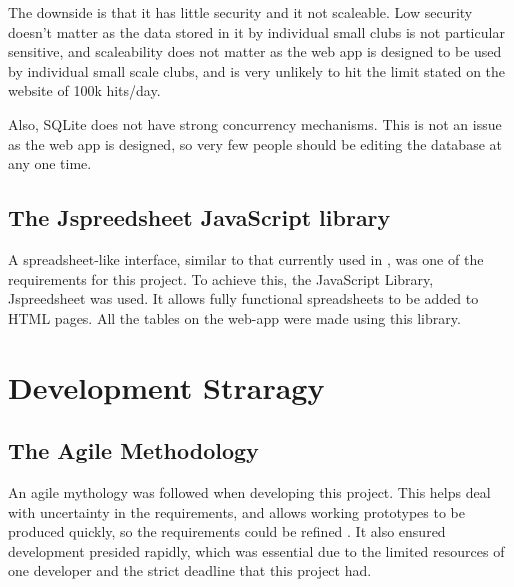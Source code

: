 \documentclass{l4proj}
\begin{document}
The downside is that it has little security and it not scaleable. Low security doesn't matter as the data stored in it by individual small clubs is not particular sensitive, and scaleability does not matter as the web app is designed to be used by individual small scale clubs, and is very unlikely to hit the limit stated on the website of 100k hits/day.

Also, SQLite does not have strong concurrency mechanisms. This is not an issue as the web app is designed, so very few people should be editing the database at any one time.

\subsection{The Jspreedsheet JavaScript library}

A spreadsheet-like interface, similar to that currently used in \citet{sailwave}, was one of the requirements for this project. To achieve this, the JavaScript Library, Jspreedsheet \citeyear{Jspreadsheet} was used. It allows fully functional spreadsheets to be added to HTML pages. All the tables on the web-app were made using this library.    

\section{Development Straragy}  

\subsection{The Agile Methodology}

An agile mythology was followed when developing this project. This helps deal with uncertainty in the requirements, and allows working prototypes to be produced quickly, so the requirements could be refined \citep{agile}. It also ensured development presided rapidly, which was essential due to the limited resources of one developer and the strict deadline that this project had.
\end{document}
